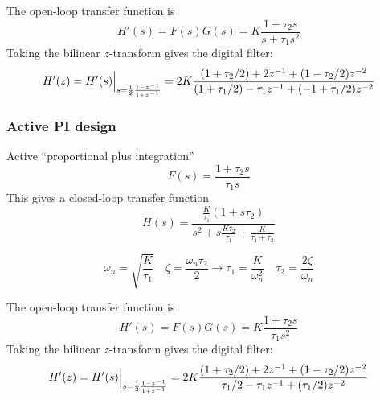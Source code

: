The open-loop transfer function is
\[
    H'(s) = F(s)G(s) = K \frac{1 + \tau_2 s}{s + \tau_1 s^2}
\]
Taking the bilinear $z$-transform gives the digital filter:
\[
    H'(z) = H'(s)\Bigl.\Bigr|_{s = \frac{1}{2}\frac{1-z^{-1}}{1+z^{-1}}}
          = 2 K \frac{
                (1+\tau_2/2) + 2 z^{-1}     + ( 1 - \tau_2/2)z^{-2}
          } {
                (1+\tau_1/2) -\tau_1 z^{-1} + (-1 + \tau_1/2)z^{-2}
          }
\]



\subsubsection{Active PI design}
Active ``proportional plus integration''
\[
    F(s) = \frac{1 + \tau_2 s}{\tau_1 s}
\]
This gives a closed-loop transfer function
\[
    H(s) = \frac{
                \frac{K}{\tau_1} (1 + s\tau_2)
           } {
                s^2 + s\frac{K\tau_2}{\tau_1} + \frac{K}{\tau_1 + \tau_2}
           }
\]

\[
    \omega_n = \sqrt{\frac{K}{\tau_1}}
    \,\,\,\,\,\,
    \zeta = \frac{\omega_n \tau_2}{2}
        \rightarrow
    \tau_1 = \frac{K}{\omega_n^2}
    \,\,\,\,\,\,
    \tau_2 = \frac{2\zeta}{\omega_n}
\]

The open-loop transfer function is
\[
    H'(s) = F(s)G(s) = K \frac{1 + \tau_2 s}{\tau_1 s^2}
\]
Taking the bilinear $z$-transform gives the digital filter:
\[
    H'(z) = H'(s)\Bigl.\Bigr|_{s = \frac{1}{2}\frac{1-z^{-1}}{1+z^{-1}}}
          = 2 K \frac{
                (1+\tau_2/2) + 2 z^{-1}     + ( 1 - \tau_2/2)z^{-2}
          } {
                \tau_1/2 -\tau_1 z^{-1} + (\tau_1/2)z^{-2}
          }
\]


